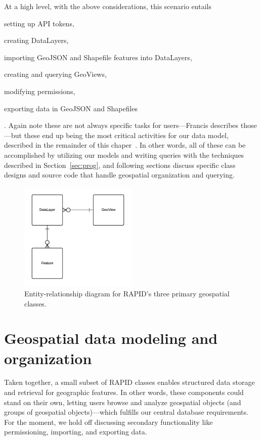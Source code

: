 At a high level, with the above considerations, this scenario entails
\begin{enumerate*}[label=\itshape\alph*\upshape)]
\item setting up API tokens,
\item creating DataLayers,
\item importing GeoJSON and Shapefile features into DataLayers,
\item creating and querying GeoViews,
\item modifying permissions,
\item exporting data in GeoJSON and Shapefiles
\end{enumerate*}. Again note these are not always specific tasks for users---Francis describes those---but these end up being the most critical activities for our data model, described in the remainder of this chaper~\cite{Francis}. In other words, all of these can be accomplished by utilizing our models and writing queries with the techniques described in Section~\ref{sec:prog}, and following sections discuss specific class designs and source code that handle geospatial organization and querying. 

\begin{figure}[ht]
    \centering
    \includegraphics[width=0.5\textwidth]{figures/3er.png}
    \caption{Entity-relationship diagram for RAPID's three primary geospatial classes.}
    \label{fig:3er}
\end{figure}

\section{Geospatial data modeling and organization}
Taken together, a small subset of RAPID classes enables structured data storage and retrieval for geographic features. In other words, these components could stand on their own, letting users browse and analyze geospatial objects (and groups of geospatial objects)---which fulfills our central database requirements. For the moment, we hold off discussing secondary functionality like permissioning, importing, and exporting data.

